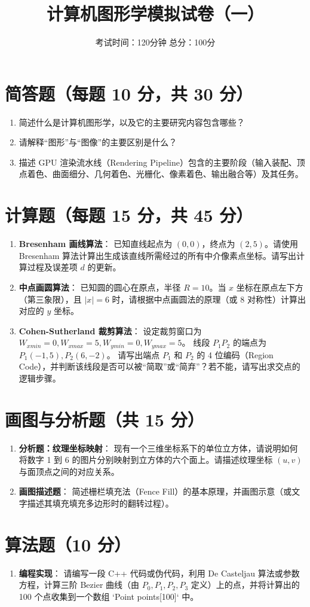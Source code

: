 \documentclass[UTF8]{ctexart}
\title{计算机图形学模拟试卷（一）}
\author{考试时间：120分钟 \quad 总分：100分}
\date{}
\begin{document}
\maketitle

\section{简答题（每题 10 分，共 30 分）}
\begin{enumerate}
    \item 简述什么是计算机图形学，以及它的主要研究内容包含哪些？
    \item 请解释“图形”与“图像”的主要区别是什么？
    \item 描述 GPU 渲染流水线（Rendering Pipeline）包含的主要阶段（输入装配、顶点着色、曲面细分、几何着色、光栅化、像素着色、输出融合等）及其任务。
\end{enumerate}

\section{计算题（每题 15 分，共 45 分）}
\begin{enumerate}
    \item \textbf{Bresenham 画线算法}：
    已知直线起点为 $(0, 0)$，终点为 $(2, 5)$。请使用 Bresenham 算法计算出生成该直线所需经过的所有中介像素点坐标。请写出计算过程及误差项 $d$ 的更新。
    
    \item \textbf{中点画圆算法}：
    已知圆的圆心在原点，半径 $R=10$。当 $x$ 坐标在原点左下方（第三象限），且 $|x|=6$ 时，请根据中点画圆法的原理（或 8 对称性）计算出对应的 $y$ 坐标。
    
    \item \textbf{Cohen-Sutherland 裁剪算法}：
    设定裁剪窗口为 $W_{xmin}=0, W_{xmax}=5, W_{ymin}=0, W_{ymax}=5$。
    线段 $P_1P_2$ 的端点为 $P_1(-1, 5), P_2(6, -2)$。
    请写出端点 $P_1$ 和 $P_2$ 的 4 位编码（Region Code），并判断该线段是否可以被“简取”或“简弃”？若不能，请写出求交点的逻辑步骤。
\end{enumerate}

\section{画图与分析题（共 15 分）}
\begin{enumerate}
    \item \textbf{分析题：纹理坐标映射}：
    现有一个三维坐标系下的单位立方体，请说明如何将数字 1 到 6 的图片分别映射到立方体的六个面上。请描述纹理坐标 $(u, v)$ 与面顶点之间的对应关系。
    \item \textbf{画图描述题}：
    简述栅栏填充法（Fence Fill）的基本原理，并画图示意（或文字描述其填充填充多边形时的翻转过程）。
\end{enumerate}

\section{算法题（10 分）}
\begin{enumerate}
    \item \textbf{编程实现}：
    请编写一段 C++ 代码或伪代码，利用 De Casteljau 算法或参数方程，计算三阶 Bezier 曲线（由 $P_0, P_1, P_2, P_3$ 定义）上的点，并将计算出的 100 个点收集到一个数组 `Point points[100]` 中。
\end{enumerate}
\end{document}

